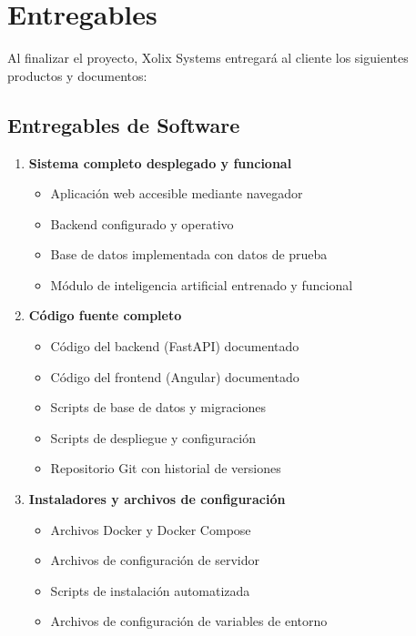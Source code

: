\documentclass[12pt,letterpaper]{article}
\begin{document}
\section{Entregables}

Al finalizar el proyecto, Xolix Systems entregará al cliente los siguientes productos y documentos:

\subsection{Entregables de Software}

\begin{enumerate}
    \item \textbf{Sistema completo desplegado y funcional}
    \begin{itemize}
        \item Aplicación web accesible mediante navegador
        \item Backend configurado y operativo
        \item Base de datos implementada con datos de prueba
        \item Módulo de inteligencia artificial entrenado y funcional
    \end{itemize}
    
    \item \textbf{Código fuente completo}
    \begin{itemize}
        \item Código del backend (FastAPI) documentado
        \item Código del frontend (Angular) documentado
        \item Scripts de base de datos y migraciones
        \item Scripts de despliegue y configuración
        \item Repositorio Git con historial de versiones
    \end{itemize}
    
    \item \textbf{Instaladores y archivos de configuración}
    \begin{itemize}
        \item Archivos Docker y Docker Compose
        \item Archivos de configuración de servidor
        \item Scripts de instalación automatizada
        \item Archivos de configuración de variables de entorno
    \end{itemize}
\end{enumerate}
\end{document}
